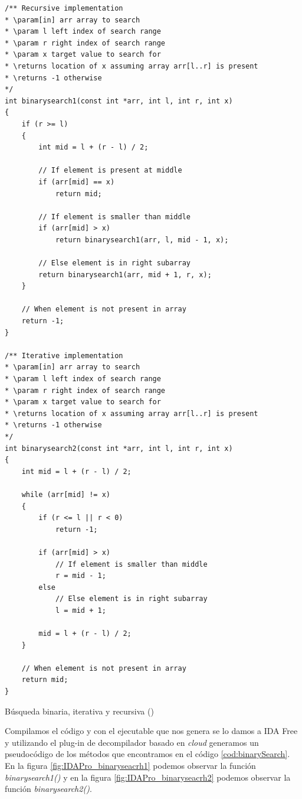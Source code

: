 \begin{mycode}
    \begin{verbatim}
/** Recursive implementation
* \param[in] arr array to search
* \param l left index of search range
* \param r right index of search range
* \param x target value to search for
* \returns location of x assuming array arr[l..r] is present
* \returns -1 otherwise
*/
int binarysearch1(const int *arr, int l, int r, int x)
{
    if (r >= l)
    {
        int mid = l + (r - l) / 2;

        // If element is present at middle
        if (arr[mid] == x)
            return mid;

        // If element is smaller than middle
        if (arr[mid] > x)
            return binarysearch1(arr, l, mid - 1, x);

        // Else element is in right subarray
        return binarysearch1(arr, mid + 1, r, x);
    }

    // When element is not present in array
    return -1;
}

/** Iterative implementation
* \param[in] arr array to search
* \param l left index of search range
* \param r right index of search range
* \param x target value to search for
* \returns location of x assuming array arr[l..r] is present
* \returns -1 otherwise
*/
int binarysearch2(const int *arr, int l, int r, int x)
{
    int mid = l + (r - l) / 2;

    while (arr[mid] != x)
    {
        if (r <= l || r < 0)
            return -1;

        if (arr[mid] > x)
            // If element is smaller than middle
            r = mid - 1;
        else
            // Else element is in right subarray
            l = mid + 1;

        mid = l + (r - l) / 2;
    }

    // When element is not present in array
    return mid;
}
    \end{verbatim}
    \caption[Búsqueda binaria, iterativa y recursiva]{Búsqueda binaria, iterativa y recursiva (\cite{BinarySearchGitHub})}
    \label{cod:binarySearch}
\end{mycode}

Compilamos el código y con el ejecutable que nos genera se lo damos a IDA Free y
utilizando el plug-in de decompilador basado en \textit{cloud} generamos un
pseudocódigo de los métodos que encontramos en el código \ref{cod:binarySearch}.
En la figura \ref{fig:IDAPro_binaryseacrh1} podemos observar la función \textit{binarysearch1()}
y en la figura \ref{fig:IDAPro_binaryseacrh2} podemos observar la función \textit{binarysearch2()}.

